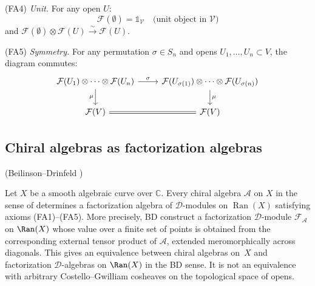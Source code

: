 \begin{definition}
(FA4) \emph{Unit.} For any open $U$:
\[\mathcal{F}(\emptyset) = \mathbb{1}_{\mathcal{V}}
 \quad \text{(unit object in } \mathcal{V}\text{)}\]
and $\mathcal{F}(\emptyset) \otimes \mathcal{F}(U) \xrightarrow{\sim} \mathcal{F}(U)$.

(FA5) \emph{Symmetry.} For any permutation $\sigma \in S_n$ and opens
$U_1, \ldots, U_n \subset V$, the diagram commutes:
\[\begin{tikzcd}
\mathcal{F}(U_1) \otimes \cdots \otimes \mathcal{F}(U_n)
 \arrow[r, "\sigma"] \arrow[d, "\mu"'] &
\mathcal{F}(U_{\sigma(1)}) \otimes \cdots \otimes \mathcal{F}(U_{\sigma(n)})
 \arrow[d, "\mu"] \\
\mathcal{F}(V) \arrow[r, equal] & \mathcal{F}(V)
\end{tikzcd}\]
\end{definition}

\subsection{Chiral algebras as factorization algebras}

\begin{theorem}
\label{thm:chiral-factorization}
\textup{(Beilinson--Drinfeld \cite[Theorem~3.4.9, \S3.4.10--3.4.12]{BD04})}

Let $X$ be a smooth algebraic curve over $\mathbb{C}$.
Every chiral algebra $\mathcal{A}$ on $X$ in the sense of
\cite[\S3.3]{BD04} determines a factorization algebra of
$\mathcal{D}$-modules on $\operatorname{Ran}(X)$ satisfying
axioms (FA1)--(FA5). More precisely, BD construct a
factorization $\mathcal D$-module $\mathcal{F}_{\mathcal A}$ on
$\Ran(X)$ whose value over a finite set of points is obtained
from the corresponding external tensor product of $\mathcal A$,
extended meromorphically across diagonals. This gives an
equivalence between chiral algebras on~$X$ and factorization
$\mathcal D$-algebras on $\Ran(X)$ in the BD sense. It is not an
equivalence with arbitrary Costello--Gwilliam cosheaves on the
topological space of opens.
\end{theorem}

